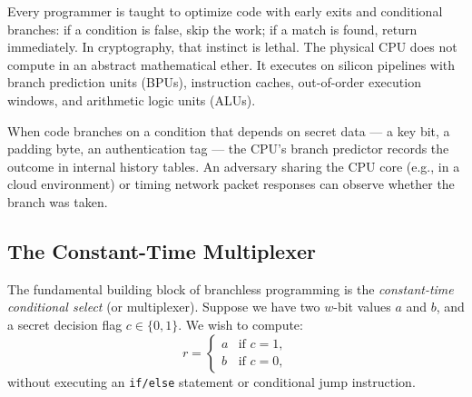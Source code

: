Every programmer is taught to optimize code with early exits and conditional branches:
if a condition is false, skip the work; if a match is found, return immediately.
In cryptography, that instinct is lethal. The physical CPU does not compute in an
abstract mathematical ether. It executes on silicon pipelines with branch prediction
units (BPUs), instruction caches, out-of-order execution windows, and arithmetic
logic units (ALUs).

When code branches on a condition that depends on secret data --- a key bit, a
padding byte, an authentication tag --- the CPU's branch predictor records the
outcome in internal history tables. An adversary sharing the CPU core (e.g., in a
cloud environment) or timing network packet responses can observe whether the branch
was taken.

\subsection{The Constant-Time Multiplexer}
\label{ch39:ct-mux}

The fundamental building block of branchless programming is the \emph{constant-time
conditional select} (or multiplexer). Suppose we have two $w$-bit values $a$ and $b$,
and a secret decision flag $c \in \{0, 1\}$. We wish to compute:
\[
r = \begin{cases} a & \text{if } c = 1, \\ b & \text{if } c = 0, \end{cases}
\]
without executing an \texttt{if/else} statement or conditional jump instruction.

